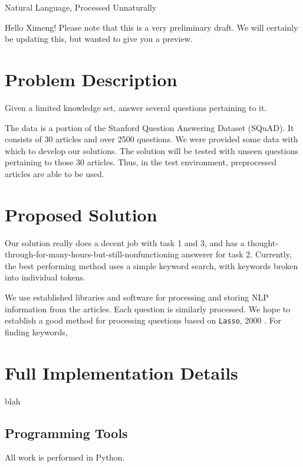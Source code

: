 \documentclass[11pt]{article}
\begin{document}
\HomeworkHeader{}{}%

\begin{center}\huge{Natural Language, Processed Unnaturally}\end{center}

Hello Ximeng! Please note that this is a very preliminary draft. We will certainly be updating this, but wanted to give you a preview.

\section{Problem Description}

Given a limited knowledge set, answer several questions pertaining to it.

The data is a portion of the Stanford Question Answering Dataset (SQuAD). It consists of 30 articles and over 2500 questions.  We were provided some data with which to develop our solutions. The solution will be tested with unseen questions pertaining to those 30 articles. Thus, in the test environment, preprocessed articles are able to be used.

\section{Proposed Solution}

Our solution really does a decent job with task 1 and 3, and has a thought-through-for-many-hours-but-still-nonfunctioning answerer for task 2. Currently, the best performing method uses a simple keyword search, with keywords broken into individual tokens.

We use established libraries and software for processing and storing NLP information from the articles. Each question is similarly processed. We hope to establish a good method for processing questions based on \texttt{Lasso}, 2000 \cite{lasso2000}. For finding keywords, 

\section{Full Implementation Details}

blah

\subsection{Programming Tools}

All work is performed in Python.
\end{document}
